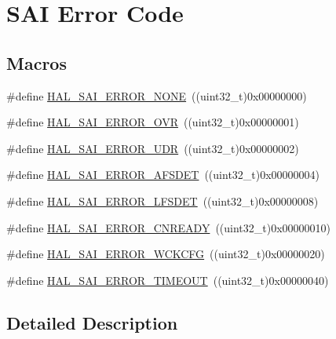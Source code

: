 \hypertarget{group___s_a_i___error___code}{}\section{S\+AI Error Code}
\label{group___s_a_i___error___code}
\subsection*{Macros}
\begin{DoxyCompactItemize}
\item 
\#define \hyperlink{group___s_a_i___error___code_ga8fb2acb5b5e215e094232328b46332eb}{H\+A\+L\+\_\+\+S\+A\+I\+\_\+\+E\+R\+R\+O\+R\+\_\+\+N\+O\+NE}~((uint32\+\_\+t)0x00000000)
\item 
\#define \hyperlink{group___s_a_i___error___code_gadde9ff1803dca89c67e4dffbdb162a1f}{H\+A\+L\+\_\+\+S\+A\+I\+\_\+\+E\+R\+R\+O\+R\+\_\+\+O\+VR}~((uint32\+\_\+t)0x00000001)
\item 
\#define \hyperlink{group___s_a_i___error___code_ga198e1a2760419cfd42d9c7ee04615396}{H\+A\+L\+\_\+\+S\+A\+I\+\_\+\+E\+R\+R\+O\+R\+\_\+\+U\+DR}~((uint32\+\_\+t)0x00000002)
\item 
\#define \hyperlink{group___s_a_i___error___code_gad78a65285134a2ad9f762851d1bfead4}{H\+A\+L\+\_\+\+S\+A\+I\+\_\+\+E\+R\+R\+O\+R\+\_\+\+A\+F\+S\+D\+ET}~((uint32\+\_\+t)0x00000004)
\item 
\#define \hyperlink{group___s_a_i___error___code_ga2b07ca89efb4765fc0273436c85ab7bb}{H\+A\+L\+\_\+\+S\+A\+I\+\_\+\+E\+R\+R\+O\+R\+\_\+\+L\+F\+S\+D\+ET}~((uint32\+\_\+t)0x00000008)
\item 
\#define \hyperlink{group___s_a_i___error___code_ga6ce2578dc1d93345450ecbceae823d88}{H\+A\+L\+\_\+\+S\+A\+I\+\_\+\+E\+R\+R\+O\+R\+\_\+\+C\+N\+R\+E\+A\+DY}~((uint32\+\_\+t)0x00000010)
\item 
\#define \hyperlink{group___s_a_i___error___code_gaa2a459f53c9b44c5a32a30740d4e2c09}{H\+A\+L\+\_\+\+S\+A\+I\+\_\+\+E\+R\+R\+O\+R\+\_\+\+W\+C\+K\+C\+FG}~((uint32\+\_\+t)0x00000020)
\item 
\#define \hyperlink{group___s_a_i___error___code_ga9093326866198c250fc9a40bd21811bc}{H\+A\+L\+\_\+\+S\+A\+I\+\_\+\+E\+R\+R\+O\+R\+\_\+\+T\+I\+M\+E\+O\+UT}~((uint32\+\_\+t)0x00000040)
\end{DoxyCompactItemize}


\subsection{Detailed Description}


